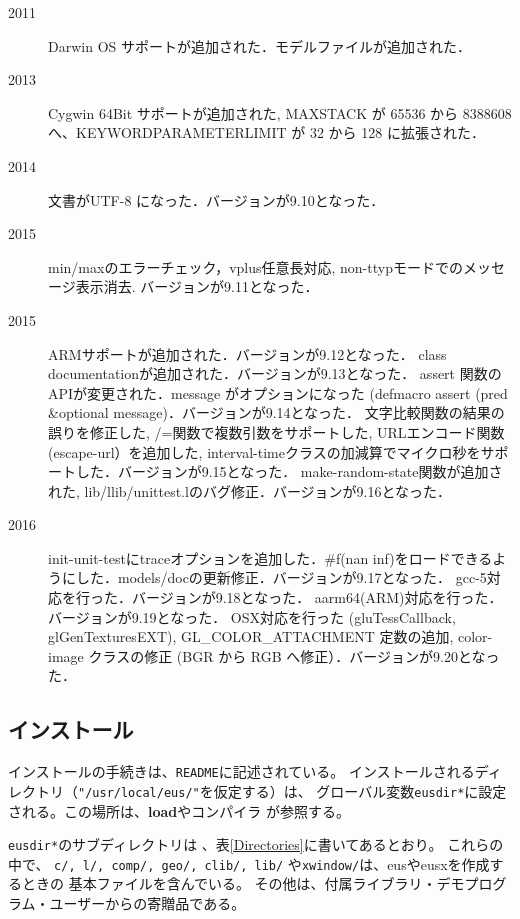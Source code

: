 \begin{description}
\item[2011] Darwin OS サポートが追加された．モデルファイルが追加された．
\item[2013] Cygwin 64Bit サポートが追加された, MAXSTACK が 65536 から 8388608 へ、KEYWORDPARAMETERLIMIT が 32 から 128 に拡張された．
\item[2014] 文書がUTF-8 になった．バージョンが9.10となった．
\item[2015] min/maxのエラーチェック，vplus任意長対応, non-ttypモードでのメッセージ表示消去. バージョンが9.11となった．
\item[2015] ARMサポートが追加された．バージョンが9.12となった．
            class documentationが追加された．バージョンが9.13となった．
            assert 関数のAPIが変更された．message がオプションになった (defmacro assert (pred \&optional message)．バージョンが9.14となった．
            文字比較関数の結果の誤りを修正した, /=関数で複数引数をサポートした, URLエンコード関数(escape-url）を追加した, interval-timeクラスの加減算でマイクロ秒をサポートした．バージョンが9.15となった．
            make-random-state関数が追加された, lib/llib/unittest.lのバグ修正．バージョンが9.16となった．
\item[2016] init-unit-testにtraceオプションを追加した．\#f(nan inf)をロードできるようにした．models/docの更新修正．バージョンが9.17となった．
            gcc-5対応を行った．バージョンが9.18となった．
            aarm64(ARM)対応を行った．バージョンが9.19となった． OSX対応を行った (gluTessCallback, glGenTexturesEXT), GL_COLOR_ATTACHMENT 定数の追加, color-image クラスの修正 (BGR から RGB へ修正）．バージョンが9.20となった．
\end{description}

\subsection{インストール}
インストールの手続きは、{\tt README}に記述されている。
インストールされるディレクトリ（{\tt "/usr/local/eus/"}を仮定する）は、
グローバル変数{\tt *eusdir*}に設定される。この場所は、{\bf load}やコンパイラ
が参照する。

{\tt *eusdir*}のサブディレクトリは 、表\ref{Directories}に書いてあるとおり。
これらの中で、
{\tt c/, l/, comp/, geo/, clib/, lib/} や{\tt xwindow/}は、eusやeusxを作成するときの
基本ファイルを含んでいる。
その他は、付属ライブラリ・デモプログラム・ユーザーからの寄贈品である。

